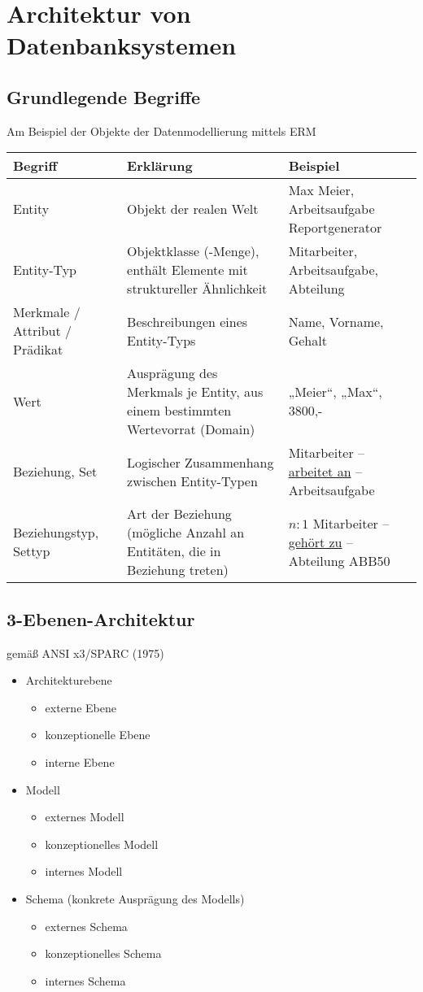 \section{Architektur von Datenbanksystemen}

\subsection{Grundlegende Begriffe}
Am Beispiel der Objekte der Datenmodellierung mittels ERM\\
\begin{tabular}{>{\raggedright}
p{} | >{\raggedright}
p{} | >{\raggedright}
p{}
}
Begriff & Erklärung & Beispiel\tabularnewline
\hline 
Entity & Objekt der realen Welt & Max Meier, Arbeitsaufgabe Reportgenerator\tabularnewline
Entity-Typ & Objektklasse (-Menge), enthält Elemente mit struktureller Ähnlichkeit & Mitarbeiter, Arbeitsaufgabe, Abteilung \tabularnewline
Merkmale / Attribut / Prädikat & Beschreibungen eines Entity-Typs & Name, Vorname, Gehalt\tabularnewline
Wert & Ausprägung des Merkmals je Entity, aus einem bestimmten Wertevorrat (Domain) & „Meier“, „Max“, 3800,-\tabularnewline
Beziehung, Set & Logischer Zusammenhang zwischen Entity-Typen & Mitarbeiter -- \underline{arbeitet an} -- Arbeitsaufgabe \tabularnewline
Beziehungstyp, Settyp & Art der Beziehung (mögliche Anzahl an Entitäten, die in Beziehung treten) & $n:1$ Mitarbeiter -- \underline{gehört zu} -- Abteilung ABB50\tabularnewline
\end{tabular}

\subsection{3-Ebenen-Architektur}
gemäß ANSI x3/SPARC (1975)
\begin{itemize}
\item Architekturebene
\begin{itemize}
\item externe Ebene
\item konzeptionelle Ebene
\item interne Ebene
\end{itemize}
\item Modell
\begin{itemize}
\item externes Modell
\item konzeptionelles Modell
\item internes Modell
\end{itemize}
\item Schema (konkrete Ausprägung des Modells)
\begin{itemize}
\item externes Schema
\item konzeptionelles Schema
\item internes Schema
\end{itemize}
\end{itemize}

